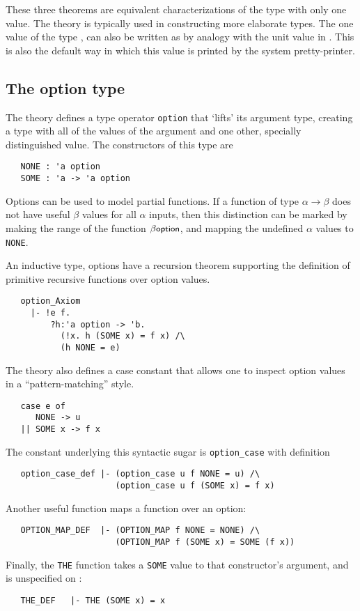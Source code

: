\noindent These three theorems are equivalent characterizations of the type
with only one value. The theory  is typically used in
constructing more elaborate types.  The one value of the type
, can also be written as \ml{()} by analogy with the unit
value in \ML.  This is also the default way in which this value is
printed by the system pretty-printer.

\subsection{The option type}

The theory  defines a type operator \verb+option+
that `lifts' its argument type, creating a type with all of the
values of the argument and one other, specially distinguished value.
The constructors of this type are
\begin{verbatim}
   NONE : 'a option
   SOME : 'a -> 'a option
\end{verbatim}
Options can be used to model partial functions.  If a function of type
$\alpha\rightarrow\beta$ does not have useful $\beta$ values for all
$\alpha$ inputs, then this distinction can be marked by making the
range of the function $\beta\mbox{\small{\textbf{\sf{option}}}}$, and mapping the
undefined $\alpha$ values to {\small\verb+NONE+}.

An inductive type, options have a recursion theorem supporting the
definition of primitive recursive functions over option values.
%
{\small
\begin{verbatim}
   option_Axiom
     |- !e f.
         ?h:'a option -> 'b.
           (!x. h (SOME x) = f x) /\
           (h NONE = e)
\end{verbatim}
}
The  theory also defines a case constant that allows
one to inspect option values in a ``pattern-matching'' style.
{\small
\begin{verbatim}
   case e of
      NONE -> u
   || SOME x -> f x
\end{verbatim}
}
\noindent
The constant underlying this syntactic sugar is \verb+option_case+
with definition
{\small
\begin{verbatim}
   option_case_def |- (option_case u f NONE = u) /\
                      (option_case u f (SOME x) = f x)
\end{verbatim}
}
\noindent
Another useful function maps a function over an option:
%
{\small
\begin{verbatim}
   OPTION_MAP_DEF  |- (OPTION_MAP f NONE = NONE) /\
                      (OPTION_MAP f (SOME x) = SOME (f x))
\end{verbatim}
}
Finally, the {\small\verb+THE+} function takes a {\small\verb+SOME+}
value to that constructor's argument, and is unspecified on
:
{\small
\begin{verbatim}
   THE_DEF   |- THE (SOME x) = x
\end{verbatim}
}

